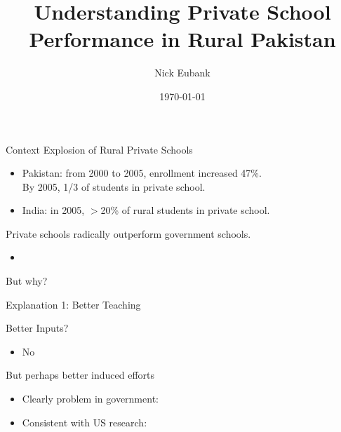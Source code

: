 \documentclass{beamer}
\title{Understanding Private School Performance in Rural Pakistan}
\author{Nick Eubank}
\date{\today}
\begin{document}
 

\begin{frame}{}
	\titlepage
\end{frame}

\begin{frame}{Context}
Explosion of Rural Private Schools
	\begin{itemize}
		\item Pakistan: from 2000 to 2005, enrollment increased 47\%. \\ 
			By 2005, 1/3 of students in private school.
		\item India: in 2005, $>$20\% of rural students in private school.
	\end{itemize}
\pause
Private schools radically outperform government schools.
	\begin{itemize}
		\item \citep{Jimenez:1991wa, Jimenez:1995vg, Pratham:2005vw, Andrabi:2011hl, Desai:2009ty, Tooley:2003vf, Alderman:2003we, Alderman:2001wk}
	\end{itemize}	
\pause
But why?
\end{frame}


\begin{frame}{Explanation 1: Better Teaching}

Better Inputs?
\begin{itemize}
	\pause
	\item No
\end{itemize}
\pause	
But perhaps better induced efforts
	\begin{itemize}
		\item Clearly problem in government:\citep{Muralidharan:2008tb, Chaudhury:2006vp}
		\item Consistent with US research: \cite{Hanushek:1997tt,Hanushek:2003hz,Banerjee:2007wx}
	\end{itemize}
\end{frame}
\end{document}
